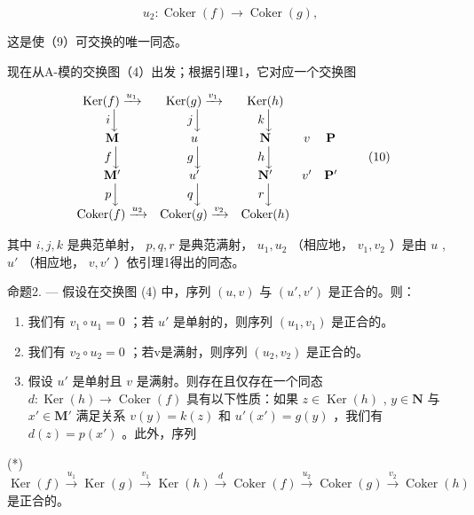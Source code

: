 \[
u _ {2}: \operatorname{Coker} (f) \rightarrow \operatorname{Coker} (g),
\]

这是使（9）可交换的唯一同态。

现在从A-模的交换图（4）出发；根据引理1，它对应一个交换图

\[
\begin{array}{c c c c c} \operatorname{Ker} (f) \xrightarrow {u _ {1}} & \operatorname{Ker} (g) \xrightarrow {v _ {1}} & \operatorname{Ker} (h) \\ i \Big \downarrow & j \Big \downarrow & k \Big \downarrow \\ \mathbf {M} & u & \mathbf {N} & v & \mathbf {P} \\ f \Big \downarrow & g \Big \downarrow & h \Big \downarrow \\ \mathbf {M} ^ {\prime} & u ^ {\prime} & \mathbf {N} ^ {\prime} & v ^ {\prime} & \mathbf {P} ^ {\prime} \\ p \Big \downarrow & q \Big \downarrow & r \Big \downarrow \\ \operatorname{Coker} (f) \xrightarrow {u _ {2}} & \operatorname{Coker} (g) \xrightarrow {v _ {2}} & \operatorname{Coker} (h) \end{array}\tag{10}
\]

其中 \(i, j, k\) 是典范单射， \(p, q, r\) 是典范满射， \(u_{1}, u_{2}\) （相应地， \(v_{1}, v_{2}\) ）是由 \(u\) , \(u'\) （相应地， \(v, v'\) ）依引理1得出的同态。

命题2. --- 假设在交换图 (4) 中，序列 \((u, v)\) 与 \((u', v')\) 是正合的。则：

\begin{enumerate}
\def\labelenumi{(\roman{enumi})}
\item
  我们有 \(v_{1} \circ u_{1} = 0\) ；若 \(u'\) 是单射的，则序列 \((u_{1}, v_{1})\) 是正合的。
\item
  我们有 \(v_2 \circ u_2 = 0\) ；若v是满射，则序列 \((u_2, v_2)\) 是正合的。
\item
  假设 \(u'\) 是单射且 \(v\) 是满射。则存在且仅存在一个同态 \(d: \operatorname{Ker}(h) \to \operatorname{Coker}(f)\) 具有以下性质：如果 \(z \in \operatorname{Ker}(h)\) , \(y \in \mathbf{N}\) 与 \(x' \in \mathbf{M}'\) 满足关系 \(v(y) = k(z)\) 和 \(u'(x') = g(y)\) ，我们有 \(d(z) = p(x')\) 。此外，序列
\end{enumerate}

(*) \(\operatorname{Ker}(f) \xrightarrow{u_1} \operatorname{Ker}(g) \xrightarrow{v_1} \operatorname{Ker}(h) \xrightarrow{d} \operatorname{Coker}(f) \xrightarrow{u_2} \operatorname{Coker}(g) \xrightarrow{v_2} \operatorname{Coker}(h)\) 是正合的。

